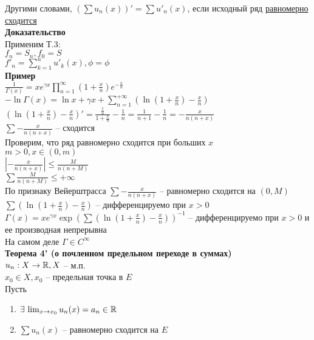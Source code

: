 \documentclass[12pt]{article}
\begin{document}
Другими словами, $(\sum u_n(x))' = \sum u'_n(x)$, если исходный ряд \underline{равномерно сходится}\\
\textbf{Доказательство}\\
Применим Т.3:\\
$f_n = S_n, f_0 = S$\\
$f'_n=\sum_{k=1}^n u'_k(x), \phi=\phi$\\
\textbf{Пример}\\
$\frac1{\Gamma(x)} = xe^{\gamma x}\prod_{n=1}^{\infty} (1+\frac xn)e^{-\frac xn}$\\
$-\ln \Gamma(x) = \ln x + \gamma x + \sum_{n=1}^{+\infty} (\ln (1+\frac xn)-\frac xn)$\\
$(\ln (1+\frac xn)-\frac xn)' = \frac{\frac1n}{1+\frac xn}-\frac1n = \frac1{n+1}-\frac1n = -\frac{x}{n(n+x)}$\\
$\sum -\frac{x}{n(n+x)}$ -- сходится\\
Проверим, что ряд равномерно сходится при больших $x$\\
$m>0, x \in (0, m)$\\
$|-\frac{x}{n(n+x)}| \leq \frac{M}{n(n+M)}$\\
$\sum \frac{M}{n(n+M)} \leq +\infty$\\
По признаку Вейерштрасса $\sum -\frac{x}{n(n+x)}$ -- равномерно сходится на $(0, M)$\\
$\sum (\ln (1+\frac xn)-\frac xn)$ -- дифференцируемо при $x>0$\\
$\Gamma(x) = xe^{\gamma x}\exp(\sum (\ln (1+\frac xn)-\frac xn))^{-1}$ -- дифференцируемо при $x>0$ и ее производная непрерывна\\
На самом деле $\Gamma \in C^\infty$\\
\textbf{Теорема 4' (о почленном предельном переходе в суммах)}\\
$u_n: X \rightarrow \mathbb{R}, X$ -- м.п.\\
$x_0 \in X, x_0$ -- предельная точка в $E$\\
Пусть \begin{enumerate}
    \item $\exists\, \lim_{x\rightarrow x_0} u_n(x) = a_n \in \mathbb{R}$
    \item $\sum u_n(x)$ -- равномерно сходится на $E$
\end{enumerate}
\end{document}
